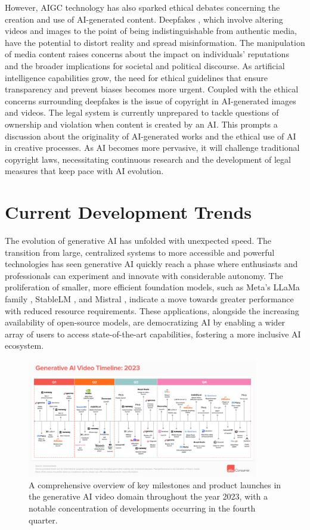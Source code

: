 \documentclass[11pt,a4paper,oneside]{report}
\begin{document}
However, AIGC technology has also sparked ethical debates concerning the creation and use of AI-generated content. 
Deepfakes \cite{westerlund2019emergence}, which involve altering videos and images to the point of being indistinguishable from authentic media, have the potential to distort reality and spread misinformation. 
The manipulation of media content raises concerns about the impact on individuals' reputations and the broader implications for societal and political discourse. 
As artificial intelligence capabilities grow, the need for ethical guidelines that ensure transparency and prevent biases becomes more urgent.
Coupled with the ethical concerns surrounding deepfakes is the issue of copyright in AI-generated images and videos. \cite{hristov2016artificial}
The legal system is currently unprepared to tackle questions of ownership and violation when content is created by an AI. 
This prompts a discussion about the originality of AI-generated works and the ethical use of AI in creative processes. 
As AI becomes more pervasive, it will challenge traditional copyright laws, necessitating continuous research and the development of legal measures that keep pace with AI evolution.


\section{Current Development Trends}

The evolution of generative AI has unfolded with unexpected speed.
The transition from large, centralized systems to more accessible and powerful technologies has seen generative AI quickly reach a phase where enthusiasts and professionals can experiment and innovate with considerable autonomy. 
The proliferation of smaller, more efficient foundation models, such as Meta's LLaMa family \cite{touvron2023llama}, StableLM \cite{StabilityAI_StableLM}, and Mistral \cite{jiang2023mistral}, indicate a move towards greater performance with reduced resource requirements. 
These applications, alongside the increasing availability of open-source models, are democratizing AI by enabling a wider array of users to access state-of-the-art capabilities, fostering a more inclusive AI ecosystem.

\begin{figure}[htbp]
  \centering
  \includegraphics[width=0.9\textwidth]{timeline.png}
  \caption{A comprehensive overview of key milestones and product launches in the generative AI video domain throughout the year 2023, with a notable concentration of developments occurring in the fourth quarter. \cite{a16zAI2023}}
\end{figure}
\end{document}
